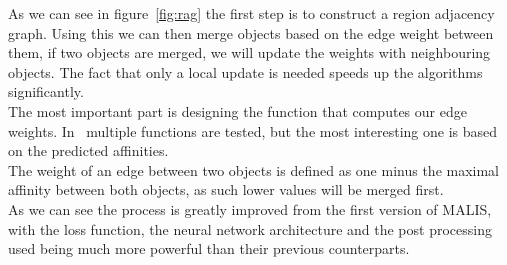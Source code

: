 As we can see in figure~\ref{fig:rag} the first step is to construct a region
adjacency graph. Using this we can then merge objects based on the edge weight
between them, if two objects are merged, we will update the weights with
neighbouring objects. The fact that only a local update is needed speeds up the
algorithms significantly.\\
The most important part is designing the function that computes our edge
weights. In~\cite{funke_large_2019} multiple functions are tested, but the most
interesting one is based on the predicted affinities.\\
The weight of an edge between two objects is defined as one minus the maximal affinity
between both objects, as such lower values will be merged first.\\


As we can see the process is greatly improved from the first version of MALIS,
with the loss function, the neural network architecture and the post processing
used being much more powerful than their previous counterparts.
